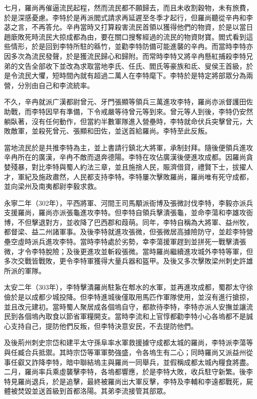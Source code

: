 七月，羅尚再催逼流民起程，然而流民都不願歸去，而且未收割穀物，未有旅費，於是深感憂慮。李特於是再派閻式請求再延遲至冬季才起行，但羅尚聽從辛冉和李苾之言，不再答允。辛冉當時又打算殺害流民首領以獲得他們的物資，於是以當日趙廞敗死時流民大掠成都為由，要在關口搜奪經過的流民的物資財寶。閻式看到這些情形，於是回到李特所駐的緜竹，並勸李特防備可能進襲的辛冉。而當時李特亦因多次為流民發聲，於是獲流民歸心和歸附。而常時李特又將辛冉懸紅捕殺李特兄弟的文告全部收下並改為求取當地李氏、任氏、閻氏等豪族和氐、叟侯王首級，於是令流民大懼，短時間內就有超過二萬人在李特麾下。李特於是特定將部眾分為兩營，分別由自己和李流統率。

不久，辛冉就派广漢都尉曾元、牙門張顯等領兵三萬進攻李特，羅尚亦派督護田佐助戰，而李特因早有準備，下令戒嚴等待曾元等到來。曾元等人到後，李特仍安然躺臥著，沒有任何動作，但當約半數軍隊進入營壘時，李特就命伏兵突擊曾元，大敗敵軍，並殺死曾元、張顯和田佐，並送首給羅尚。李特至此反叛。

當地流民於是共推李特為主，並上書請行鎮北大將軍，承制封拜。隨後便領兵進攻辛冉所在的廣漢，辛冉不敵而退奔德陽。李特在攻佔廣漢後便進攻成都。因羅尚貪婪殘暴，對比李特與蜀人約法三章，並且施捨人民，賑濟借貸，禮賢下士，拔擢人才，軍紀及施政肅然，人民都支持李特。李特屢次擊敗羅尚，羅尚唯有死守成都，並向梁州及南夷都尉李毅求救。

永寧二年（302年），平西將軍、河間王司馬顒派衙博及張微討伐李特，李毅亦派兵支援羅尚，羅尚亦派張龜進攻李特。但李特自領兵擊潰張龜，並命李蕩和李雄攻衙博，不但擊退對方，並收降了巴西郡和葭萌。同年，李特自稱為大將軍、益州牧，都督梁、益二州諸軍事。及後李特就進攻張微，但張微居高據險防守，並趁李特營壘空虛時派兵進攻李特。當時李特處於劣勢，幸李蕩援軍趕到並拼死一戰擊潰張微，才令李特脫險；及後更進攻並斬殺張微。當時羅尚繼續進攻城外李特等軍，但多次交戰皆戰敗，更令李特軍獲得大量兵器和盔甲。及後又多次擊敗梁州刺史許雄所派的軍隊。

太安二年（303年），李特擊潰羅尚駐紥在郫水的水軍，並再進攻成都，蜀郡太守徐儉於是以成都少城投降。但李特進城後僅取用馬匹作軍隊使用，並沒有進行搶掠，並且改元建初。當時蜀人聚居成各個塢自守，都款待李特，李特亦派人安撫並讓流民到各個塢內取食以節省軍糧開支。當時李流和上官惇都勸李特小心各塢都不是誠心支持自己，提防他們反叛，但李特決意安民，不去提防他們。

及後荊州刺史宗岱和建平太守孫阜率水軍救援據守成都太城的羅尚，李特派李蕩等與任臧合兵抵禦。其時宗岱等軍軍勢強盛，令各塢生有二心；同時羅尚又派益州從事任叡又詐降李特，暗中聯結塢主與羅尚一同舉兵，並假稱成都太城內糧食將盡。二月，羅尚率兵乘虛襲擊李特，各塢都響應，於是李特大敗，收兵駐守新繁。後李特見羅尚退兵，於是追擊，最終被羅尚出大軍反擊，李特及李輔和李遠都戰死，屍體被焚毀並送首級到首都洛陽。其弟李流接管其部眾。

